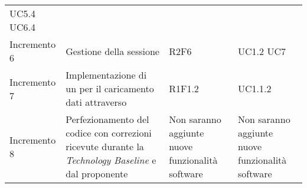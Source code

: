 \begin{longtable}{C{3cm} C{7cm} C{2cm} C{2cm}}
UC5.4 \newline UC6.4\\
Incremento 6 & 
Gestione della sessione & 
R2F6 & 
UC1.2 \newline UC7\\
Incremento 7 & 
Implementazione di un  per il caricamento dati attraverso  & 
R1F1.2 & 
UC1.1.2\\
Incremento 8 & 
Perfezionamento del codice con correzioni ricevute durante la \textit{Technology Baseline} e dal proponente & 
Non saranno aggiunte nuove funzionalità software & 
Non saranno aggiunte nuove funzionalità software\\

\end{longtable}

